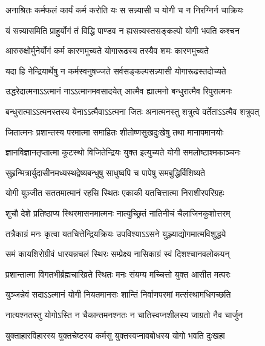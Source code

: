 \twolineshloka
{अनाश्रितः कर्मफलं कार्यं कर्म करोति यः}
{स सन्न्यासी च योगी च न निरग्निर्न चाक्रियः}%

\twolineshloka
{यं सन्न्यासमिति प्राहुर्योगं तं विद्धि पाण्डव}
{न ह्यसन्न्यस्तसङ्कल्पो योगी भवति कश्चन}%

\twolineshloka
{आरुरुक्षोर्मुनेर्योगं कर्म कारणमुच्यते}
{योगारूढस्य तस्यैव शमः कारणमुच्यते}%

\twolineshloka
{यदा हि नेन्द्रियार्थेषु न कर्मस्वनुषज्जते}
{सर्वसङ्कल्पसन्न्यासी योगारूढस्तदोच्यते}%

\twolineshloka
{उद्धरेदात्मनाऽऽत्मानं नाऽऽत्मानमवसादयेत्}
{आत्मैव ह्यात्मनो बन्धुरात्मैव रिपुरात्मनः}%

\twolineshloka
{बन्धुरात्माऽऽत्मनस्तस्य येनाऽऽत्मैवाऽऽत्मना जितः}
{अनात्मनस्तु शत्रुत्वे वर्तेताऽऽत्मैव शत्रुवत्}%

\twolineshloka
{जितात्मनः प्रशान्तस्य परमात्मा समाहितः}
{शीतोष्णसुखदुःखेषु तथा मानापमानयोः}%

\twolineshloka
{ज्ञानविज्ञानतृप्तात्मा कूटस्थो विजितेन्द्रियः}
{युक्त इत्युच्यते योगी समलोष्टाश्मकाञ्चनः}%

\twolineshloka
{सुहृन्मित्रार्युदासीनमध्यस्थद्वेष्यबन्धुषु}
{साधुष्वपि च पापेषु समबुद्धिर्विशिष्यते}%

\twolineshloka
{योगी युञ्जीत सततमात्मानं रहसि स्थितः}
{एकाकी यतचित्तात्मा निराशीरपरिग्रहः}%

\twolineshloka
{शुचौ देशे प्रतिष्ठाप्य स्थिरमासनमात्मनः}
{नात्युच्छ्रितं नातिनीचं चैलाजिनकुशोत्तरम्}%

\twolineshloka
{तत्रैकाग्रं मनः कृत्वा यतचित्तेन्द्रियक्रियः}
{उपविश्याऽऽसने युञ्ज्याद्योगमात्मविशुद्धये}%

\twolineshloka
{समं कायशिरोग्रीवं धारयन्नचलं स्थिरः}
{सम्प्रेक्ष्य नासिकाग्रं स्वं दिशश्चानवलोकयन्}%

\twolineshloka
{प्रशान्तात्मा विगतभीर्ब्रह्मचारिव्रते स्थितः}
{मनः संयम्य मच्चित्तो युक्त आसीत मत्परः}%

\twolineshloka
{युञ्जन्नेवं सदाऽऽत्मानं योगी नियतमानसः}
{शान्तिं निर्वाणपरमां मत्संस्थामधिगच्छति}%

\twolineshloka
{नात्यश्नतस्तु योगोऽस्ति न चैकान्तमनश्नतः}
{न चातिस्वप्नशीलस्य जाग्रतो नैव चार्जुन}%

\twolineshloka
{युक्ताहारविहारस्य युक्तचेष्टस्य कर्मसु}
{युक्तस्वप्नावबोधस्य योगो भवति दुःखहा}%

